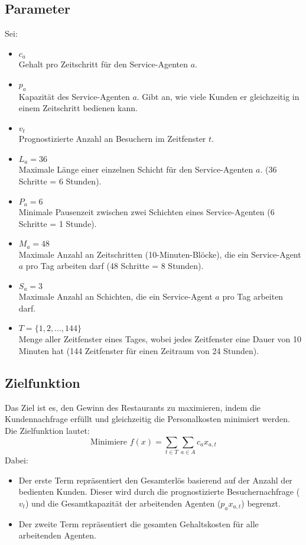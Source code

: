 \subsection*{Parameter}
Sei:
\begin{itemize}
    \item $ c_a $\\
          Gehalt pro Zeitschritt für den Service-Agenten $ a $.
    \item $ p_a $\\
          Kapazität des Service-Agenten $ a $. Gibt an, wie viele Kunden er gleichzeitig in einem Zeitschritt bedienen kann.
    \item $ v_t $\\
          Prognostizierte Anzahl an Besuchern im Zeitfenster $ t $.
    \item $ L_a = 36 $\\
          Maximale Länge einer einzelnen Schicht für den Service-Agenten $ a $. (36 Schritte = 6 Stunden).
    \item $ P_a = 6 $\\
          Minimale Pausenzeit zwischen zwei Schichten eines Service-Agenten (6 Schritte = 1 Stunde).
    \item $ M_a = 48 $\\
          Maximale Anzahl an Zeitschritten (10-Minuten-Blöcke), die ein Service-Agent $ a $ pro Tag arbeiten darf (48 Schritte = 8 Stunden).
    \item $ S_a = 3 $\\
          Maximale Anzahl an Schichten, die ein Service-Agent $ a $ pro Tag arbeiten darf.
    \item $ T = \{1, 2, ..., 144\}$\\
          Menge aller Zeitfenster eines Tages, wobei jedes Zeitfenster eine Dauer von 10 Minuten hat (144 Zeitfenster für einen Zeitraum von 24 Stunden).
\end{itemize}

\subsection*{Zielfunktion}
Das Ziel ist es, den Gewinn des Restaurants zu maximieren, indem die Kundennachfrage erfüllt und gleichzeitig die Personalkosten minimiert werden. Die Zielfunktion lautet:
$$\text{Minimiere } f(x) = \sum_{t \in T} \sum_{a \in A} c_a x_{a,t}$$
Dabei:
\begin{itemize}
    \item Der erste Term repräsentiert den Gesamterlös basierend auf der Anzahl der bedienten Kunden. Dieser wird durch die prognostizierte Besuchernachfrage ($v_t$) und die Gesamtkapazität der arbeitenden Agenten ($p_a x_{a,t}$) begrenzt.
    \item Der zweite Term repräsentiert die gesamten Gehaltskosten für alle arbeitenden Agenten.
\end{itemize}

